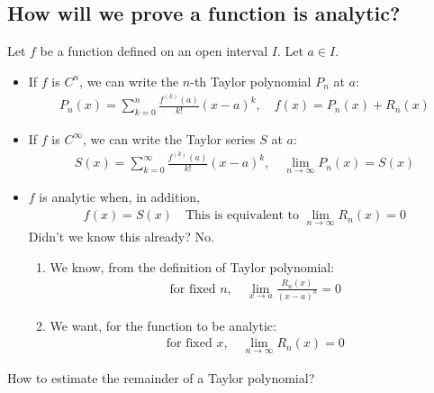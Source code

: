 \subsection*{How will we prove a function is analytic?}
Let \(f\) be a function defined on an open interval \(I\). Let \(a \in I\). \begin{itemize}
    \item If \(f\) is \(C^n\), we can write the \(n\)-th Taylor polynomial \(P_n\) at \(a\): \begin{align*}
              P_n(x) = \sum_{k = 0}^{n} \frac{f^{(k)}(a)}{k!} (x-a)^k, \quad \boxed{f(x) = P_n(x) + R_n(x)}
          \end{align*}
    \item If \(f\) is \(C^\infty\), we can write the Taylor series \(S\) at \(a\): \begin{align*}
              S(x) = \sum_{k = 0}^{\infty} \frac{f^{(k)}(a)}{k!} (x - a)^k, \quad \boxed{\lim_{n\to \infty} P_n(x) = S(x)}
          \end{align*}
    \item \(f\) is analytic when, in addition, \begin{align*}
              f(x) = S(x) \quad \boxed{\text{This is equivalent to } \lim_{n\to \infty} R_n(x) = 0}
          \end{align*}
          Didn't we know this already? No.
          \begin{enumerate}
              \item We know, from the definition of Taylor polynomial: \begin{align*}
                        \text{for fixed } n, \quad \lim_{x\to a} \frac{R_n(x)}{(x-a)^n} = 0
                    \end{align*}
              \item We want, for the function to be analytic: \begin{align*}
                        \text{for fixed } x, \quad \lim_{n\to\infty} R_n(x) = 0
                    \end{align*}
          \end{enumerate}
\end{itemize}
How to estimate the remainder of a Taylor polynomial?
